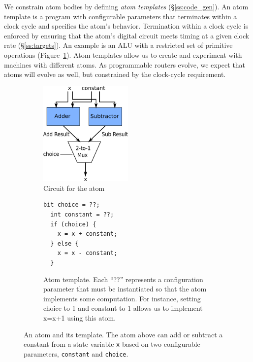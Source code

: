 We constrain atom bodies by defining {\it atom templates}
(\S\ref{ss:code_gen}).  An atom template is a program with configurable
parameters that terminates within a clock cycle and specifies the atom's
behavior.  Termination within a clock cycle is enforced by ensuring that the
atom's digital circuit meets timing at a given clock rate (\S\ref{ss:targets}).
An example is an ALU with a restricted set of primitive operations
(Figure~\ref{fig:alu_diag}). Atom templates allow us to create and experiment
with \absmachine machines with different atoms. As programmable routers evolve,
we expect that atoms will evolve as well, but constrained by the clock-cycle
requirement.


\begin{figure}[h]
  \begin{subfigure}{0.5\columnwidth}
  \centering
  \includegraphics[width=0.5\textwidth]{domino_circuit.pdf}
  \caption{Circuit for the atom}
  \label{fig:alu_diag}
  \end{subfigure}
  \hspace{0.1\columnwidth}
  \begin{subfigure}{0.3\columnwidth}
  \begin{lstlisting}[belowskip=-0.8 \baselineskip]
  bit choice = ??;
  int constant = ??;
  if (choice) {
    x = x + constant;
  } else {
    x = x - constant;
  }
  \end{lstlisting}
  \hspace{0.1\columnwidth}
  \caption{Atom template. Each ``??'' represents a configuration parameter that
  must be instantiated so that the atom implements some computation. For
  instance, setting choice to 1 and constant to 1 allows us to implement x=x+1
  using this atom.}
  \label{fig:alu_in_sketch}
  \end{subfigure}
  \caption{An atom and its template. The atom above can add or subtract a
  constant from a state variable {\tt x} based on two configurable parameters,
  {\tt constant} and {\tt choice}.}
  \label{fig:atom}
\end{figure}

